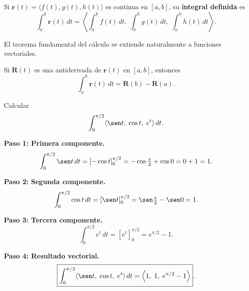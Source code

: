 \begin{definition}
Si $\mathbf{r}(t) = \langle f(t), g(t), h(t) \rangle$ es continua en
$[a,b]$, su \textbf{integral definida} es
\[
\int_a^b \mathbf{r}(t)\,dt
= \left\langle \int_a^b f(t)\,dt,\;
            \int_a^b g(t)\,dt,\;
            \int_a^b h(t)\,dt \right\rangle.
\]
\end{definition}

El teorema fundamental del cálculo se extiende naturalmente a funciones
vectoriales.

\begin{theorem}
Si $\mathbf{R}(t)$ es una antiderivada de $\mathbf{r}(t)$ en $[a,b]$,
entonces
\[
\int_a^b \mathbf{r}(t)\,dt = \mathbf{R}(b) - \mathbf{R}(a).
\]
\end{theorem}

\begin{example}
Calcular
\[
\int_0^{\pi/2} \langle \sen t,\; \cos t,\; e^t \rangle\,dt.
\]
\begin{myproof}
\textbf{Paso 1: Primera componente.}
\[
\int_0^{\pi/2} \sen t\,dt = [-\cos t]_0^{\pi/2}
= -\cos\tfrac{\pi}{2} + \cos 0 = 0 + 1 = 1.
\]

\textbf{Paso 2: Segunda componente.}
\[
\int_0^{\pi/2} \cos t\,dt = [\sen t]_0^{\pi/2}
= \sen\tfrac{\pi}{2} - \sen 0 = 1.
\]

\textbf{Paso 3: Tercera componente.}
\[
\int_0^{\pi/2} e^t\,dt = [e^t]_0^{\pi/2}
= e^{\pi/2} - 1.
\]

\textbf{Paso 4: Resultado vectorial.}
\[
\boxed{\int_0^{\pi/2} \langle \sen t,\; \cos t,\; e^t \rangle\,dt
      = \left\langle 1,\; 1,\; e^{\pi/2} - 1 \right\rangle}.
\]
\end{myproof}
\end{example}

